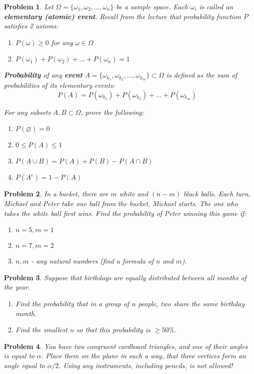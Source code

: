 \documentclass[a4paper,12pt]{article}
\theoremstyle{perfect}
\newtheorem{prb}{Problem}
\begin{document}
\begin{prb}
Let $\Omega = \{\omega_1, \omega_2, ..., \omega_n\}$ be a sample space. Each $\omega_i$ is called an \textbf{elementary (atomic) event}. Recall from the lecture that probability function $P$ satisfies 2 axioms:
\begin{enumerate}
\item $P(\omega) \geq 0$ for any $\omega \in \Omega$
\item $P(\omega_1) + P(\omega_2) + ... + P(\omega_n) = 1$
\end{enumerate}
\textbf{Probability} of any \textbf{event} $A = \{\omega_{k_1}, \omega_{k_2}, ..., \omega_{k_m}\} \subset \Omega$ is defined as the sum of probabilities of its elementary events:
$$P(A) = P(\omega_{k_1}) + P(\omega_{k_2}) + ... + P(\omega_{k_m})$$

\noindent
For any subsets $A, B \subset \Omega$, prove the following:
\begin{enumerate}
\item $P(\varnothing) = 0$
\item $0 \leq P(A) \leq 1$
\item $P(A \cup B) = P(A) + P(B) - P(A \cap B)$
\item $P(A^c) = 1 - P(A)$
\end{enumerate}
\end{prb}


\begin{prb}
In a bucket, there are $m$ white and $(n-m)$ black balls. Each turn, Michael and Peter take one ball from the bucket, Michael starts. The one who takes the white ball first wins. Find the probability of Peter winning this game if:
\begin{enumerate}
\item $n=5, m=1$
\item $n=7, m=2$
\item $n,m$ - any natural numbers (find a formula of $n$ and $m$).
\end{enumerate}
\end{prb}


\begin{prb}
Suppose that birthdays are equally distributed between all months of the year.
\begin{enumerate}
\item Find the probability that in a group of  $n$ people, two share the same birthday month.
\item Find the smallest $n$ so that this probability is $\geq 50\%$.
\end{enumerate}
\end{prb} 

\begin{prb}
You have two congruent cardboard triangles, and one of their angles is equal to $\alpha$. 
Place them on the plane in such a way, that three vertices form an angle equal to $\alpha / 2$. Using any instruments, including pencils, is not allowed!
\end{prb}

 
\end{document}
